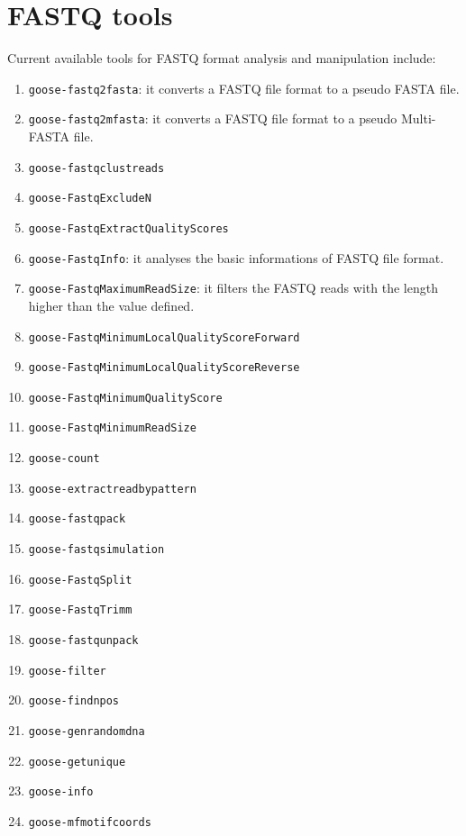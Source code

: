 \chapter{FASTQ tools}
\label{fastq}

Current available tools for FASTQ format analysis and manipulation include:
\begin{enumerate}

\item \texttt{goose-fastq2fasta}: it converts a FASTQ file format to a pseudo FASTA file.
\item \texttt{goose-fastq2mfasta}: it converts a FASTQ file format to a pseudo Multi-FASTA file.
\item \texttt{goose-fastqclustreads}
\item \texttt{goose-FastqExcludeN}
\item \texttt{goose-FastqExtractQualityScores}
\item \texttt{goose-FastqInfo}: it analyses the basic informations of FASTQ file format.
\item \texttt{goose-FastqMaximumReadSize}: it filters the FASTQ reads with the length higher than the value defined.
\item \texttt{goose-FastqMinimumLocalQualityScoreForward}
\item \texttt{goose-FastqMinimumLocalQualityScoreReverse}
\item \texttt{goose-FastqMinimumQualityScore}
\item \texttt{goose-FastqMinimumReadSize}

\item \texttt{goose-count}
\item \texttt{goose-extractreadbypattern}

\item \texttt{goose-fastqpack}
\item \texttt{goose-fastqsimulation}
\item \texttt{goose-FastqSplit}
\item \texttt{goose-FastqTrimm}
\item \texttt{goose-fastqunpack}
\item \texttt{goose-filter}
\item \texttt{goose-findnpos}

\item \texttt{goose-genrandomdna}
\item \texttt{goose-getunique}
\item \texttt{goose-info}
\item \texttt{goose-mfmotifcoords}


\end{enumerate}
